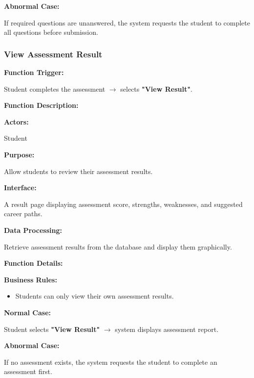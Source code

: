 \textbf{Abnormal Case:}

If required questions are unanswered, the system requests the student to complete all questions before submission.


\subsubsection{View Assessment Result}

\textbf{Function Trigger:}

Student completes the assessment $\rightarrow$ selects \textbf{"View Result"}.

\vspace{0.3cm}

\textbf{Function Description:}

\textbf{Actors:}

Student

\vspace{0.2cm}

\textbf{Purpose:}

Allow students to review their assessment results.

\vspace{0.2cm}

\textbf{Interface:}

A result page displaying assessment score, strengths, weaknesses, and suggested career paths.

\vspace{0.2cm}

\textbf{Data Processing:}

Retrieve assessment results from the database and display them graphically.

\vspace{0.3cm}

\textbf{Function Details:}

\textbf{Business Rules:}

\begin{itemize}
\item Students can only view their own assessment results.
\end{itemize}

\textbf{Normal Case:}

Student selects \textbf{"View Result"} $\rightarrow$ system displays assessment report.

\textbf{Abnormal Case:}

If no assessment exists, the system requests the student to complete an assessment first.


